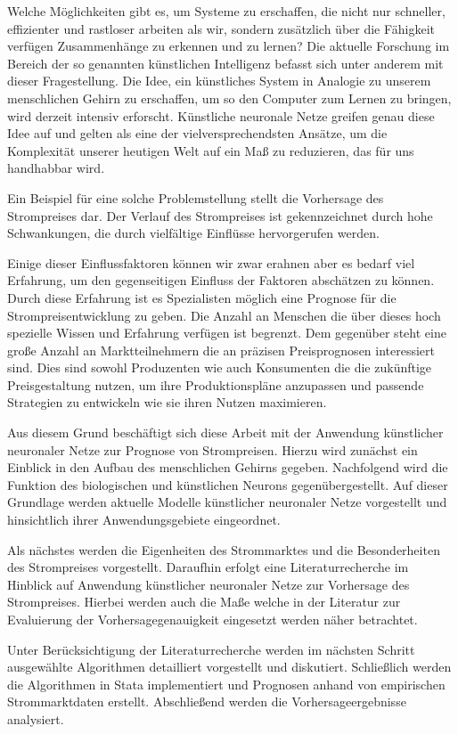 Welche Möglichkeiten gibt es, um Systeme zu erschaffen, die nicht nur schneller, effizienter und rastloser arbeiten als wir, sondern zusätzlich über die Fähigkeit verfügen Zusammenhänge zu erkennen und zu lernen? Die aktuelle Forschung im Bereich der so genannten künstlichen Intelligenz befasst sich unter anderem mit dieser Fragestellung. Die Idee, ein künstliches System in Analogie zu unserem menschlichen Gehirn zu erschaffen, um so den Computer zum Lernen zu bringen, wird derzeit intensiv erforscht. Künstliche neuronale Netze greifen genau diese Idee auf und gelten als eine der vielversprechendsten Ansätze, um die Komplexität unserer heutigen Welt auf ein Maß zu reduzieren, das für uns handhabbar wird.

Ein Beispiel für eine solche Problemstellung stellt die Vorhersage des Strompreises dar. Der Verlauf des Strompreises ist gekennzeichnet durch hohe Schwankungen, die durch vielfältige Einflüsse hervorgerufen werden. 


Einige dieser Einflussfaktoren können wir zwar erahnen aber es bedarf viel Erfahrung, um den gegenseitigen Einfluss der Faktoren abschätzen zu können. Durch diese Erfahrung ist es Spezialisten möglich eine Prognose für die Strompreisentwicklung zu geben. Die Anzahl an Menschen die über dieses hoch spezielle Wissen und Erfahrung verfügen ist begrenzt. Dem gegenüber steht eine große Anzahl an Marktteilnehmern die an präzisen Preisprognosen interessiert sind. Dies sind sowohl Produzenten wie auch Konsumenten die die zukünftige Preisgestaltung nutzen, um ihre Produktionspläne anzupassen und passende Strategien zu entwickeln wie sie ihren Nutzen maximieren.

Aus diesem Grund beschäftigt sich diese Arbeit mit der Anwendung künstlicher neuronaler Netze zur Prognose von Strompreisen. Hierzu wird zunächst ein Einblick in den Aufbau des menschlichen Gehirns gegeben. Nachfolgend wird die Funktion des biologischen und künstlichen Neurons gegenübergestellt. Auf dieser Grundlage werden aktuelle Modelle künstlicher neuronaler Netze vorgestellt und hinsichtlich ihrer Anwendungsgebiete eingeordnet. 

Als nächstes werden die Eigenheiten des Strommarktes und die Besonderheiten des Strompreises vorgestellt. Daraufhin erfolgt eine Literaturrecherche im Hinblick auf Anwendung künstlicher neuronaler Netze zur Vorhersage des Strompreises. Hierbei werden auch die Maße welche in der Literatur zur Evaluierung der Vorhersagegenauigkeit eingesetzt werden näher betrachtet. 

Unter Berücksichtigung der Literaturrecherche werden im nächsten Schritt ausgewählte Algorithmen detailliert vorgestellt und diskutiert. Schließlich werden die Algorithmen in Stata implementiert und Prognosen anhand von empirischen Strommarktdaten erstellt. Abschließend werden die Vorhersageergebnisse analysiert.


\newpage

